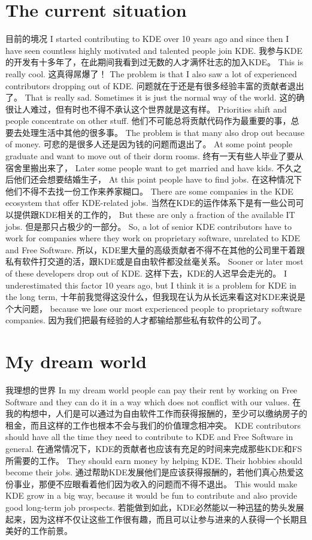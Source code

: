 \section*{The current situation}
{目前的境况}
I started contributing to KDE over 10 years ago and since then I have seen countless highly motivated and talented people join KDE.
我参与KDE的开发有十多年了，在此期间我看到过无数的人才满怀壮志的加入KDE。
This is really cool.
这真得屌爆了！
The problem is that I also saw a lot of experienced contributors dropping out of KDE.
问题就在于还是有很多经验丰富的贡献者退出了。
That is really sad. Sometimes it is just the normal way of the world.
这的确很让人难过，但有时也不得不承认这个世界就是这有样。
Priorities shift and people concentrate on other stuff. 
他们不可能总将贡献代码作为最重要的事，总要去处理生活中其他的很多事。
The problem is that many also drop out because of money.
可悲的是很多人还是因为钱的问题而退出了。
At some point people graduate and want to move out of their dorm rooms.
终有一天有些人毕业了要从宿舍里搬出来了，
Later some people want to get married and have kids.
不久之后他们还会想要结婚生子，
At this point people have to find jobs.
在这种情况下他们不得不去找一份工作来养家糊口。
There are some companies in the KDE ecosystem that offer KDE-related jobs.
当然在KDE的运作体系下是有一些公司可以提供跟KDE相关的工作的，
But these are only a fraction of the available IT jobs.
但是那只占极少的一部分。
So, a lot of senior KDE contributors have to work for companies where they work on proprietary software, unrelated to KDE and Free Software. 
所以，KDE里大量的高级贡献者不得不在其他的公司里干着跟私有软件打交道的活，跟KDE或是自由软件都没丝毫关系。
Sooner or later most of these developers drop out of KDE.
这样下去，KDE的人迟早会走光的。
I underestimated this factor 10 years ago, but I think it is a problem for KDE in the long term,
十年前我觉得这没什么，但我现在认为从长远来看这对KDE来说是个大问题，
because we lose our most experienced people to proprietary software companies.
因为我们把最有经验的人才都输给那些私有软件的公司了。
\section*{My dream world}
{我理想的世界}
In my dream world people can pay their rent by working on Free Software and
they can do it in a way which does not conflict with our values.
在我的构想中，人们是可以通过为自由软件工作而获得报酬的，至少可以缴纳房子的租金，而且这样的工作也根本不会与我们的价值理念相冲突。
KDE contributors should have all the time they need to contribute to KDE and Free Software in general.
在通常情况下，KDE的贡献者也应该有充足的时间来完成那些KDE和FS所需要的工作。
They should earn money by helping KDE. Their hobbies should become their jobs. 
通过帮助KDE发展他们是应该获得报酬的，若他们真心热爱这份事业，那便不应眼看着他们因为收入的问题而不得不退出。
This would make KDE grow in a big way, because it would be fun to contribute and also provide good long-term job prospects.
若能做到如此，KDE必然能以一种迅猛的势头发展起来，因为这样不仅让这些工作很有趣，而且可以让参与进来的人获得一个长期且美好的工作前景。

